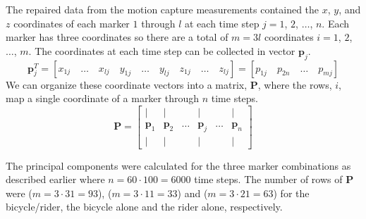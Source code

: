 The repaired data from the motion capture measurements contained the $x$, $y$, and $z$ coordinates of each marker $1$ through $l$ at each time step $j=1$, $2$, $\ldots$, $n$. Each marker has three coordinates so there are a total of $m=3l$ coordinates $i=1$, $2$, $\ldots$, $m$. The coordinates at each time step can be collected in vector $\mathbf{p}_j$.
\begin{displaymath}
    \mathbf{p}_j^T=\left[x_{1j}\quad\ldots\quad x_{lj}\quad y_{1j}\quad\ldots\quad y_{lj}\quad z_{1j}\quad\ldots\quad z_{lj}\right]=\left[p_{1j}\quad p_{2n}\quad\ldots\quad    p_{mj}\right]
\end{displaymath}
We can organize these coordinate vectors into a matrix, $\mathbf{P}$, where the rows, $i$, map a single coordinate of a marker through $n$ time steps.
\begin{displaymath}
\mathbf{P}=\left[ \begin{array}{cccccc}
|              & |              &        & |              &        & |             \\
\mathbf{p}_{1} & \mathbf{p}_{2} & \ldots & \mathbf{p}_{j} & \ldots & \mathbf{p}_{n}\\
|              & |              &        & |              &        & |
\end{array} \right]
\end{displaymath}

The principal components were calculated for the three marker combinations as described earlier where $n=60\cdot100=6000$ time steps. The number of rows of $\mathbf{P}$ were ($m=3\cdot31=93$), ($m=3\cdot11=33$) and ($m=3\cdot21=63$) for the bicycle/rider, the bicycle alone and the rider alone, respectively.

